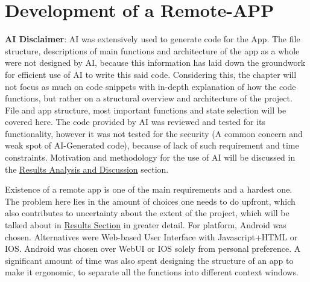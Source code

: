 \section{Development of a Remote-APP}\label{sec:FrontendDev}
\textbf{AI Disclaimer}: AI was extensively used to generate  code for the App. The file structure, descriptions of main functions and architecture of the app as a whole were not designed by AI, because this information has laid down the groundwork for efficient use of AI to write this said code. Considering this, the chapter will not focus as much on code snippets with in-depth explanation of how the code functions, but rather on a structural overview and architecture of the project. File and app structure, most important functions and state selection will be covered here. The code provided by AI was reviewed and tested for its functionality, however it was not tested for the security (A common concern and weak spot of AI-Generated code), because of lack of such requirement and time constraints. Motivation and methodology for the use of AI will be discussed in the \hyperref[sec:discussion]{Results Analysis and Discussion} section.

Existence of a remote app is one of the main requirements and a hardest one. The problem here lies in the amount of choices one needs to do upfront, which also contributes to uncertainty about the extent of the project, which will be talked about in \hyperref[sec:discussion]{Results Section} in greater detail. For platform, Android was chosen. Alternatives were Web-based User Interface with Javascript+HTML or IOS. Android was chosen over WebUI or IOS solely from personal preference. A significant amount of time was also spent designing the structure of an app to make it ergonomic, to separate all the functions into different context windows.

